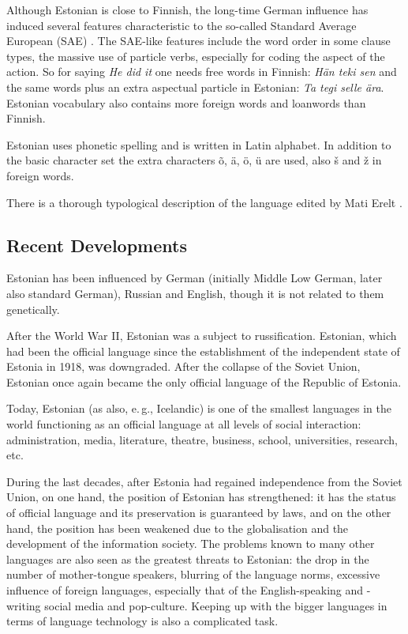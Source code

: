 \begin{multicols}{2}
Although Estonian is close to Finnish, the long-time German influence has induced several features characteristic to the so-called Standard Average European (SAE) \cite{Metslang09}. 
The SAE-like features include the word order in some clause types, the massive use of particle verbs, especially for coding the aspect of the action. 
So for saying \textit{He did it} one needs free words in Finnish: \textit{Hän teki sen} and the same words plus an extra aspectual particle in Estonian: \textit{Ta tegi selle ära}. 
Estonian vocabulary also contains more foreign words and loanwords than Finnish.

Estonian uses phonetic spelling and is written in Latin alphabet. 
In addition to the basic character set the extra characters õ, ä, ö, ü are used, also š and ž in foreign words.

There is a thorough typological description of the language edited by Mati Erelt \cite{erelt2003}. %

\subsection{Recent Developments}

Estonian has been influenced by German (initially Middle Low German, later also standard German), Russian and English, though it is not related to them genetically.

After the World War II, Estonian was a subject to russiﬁcation. 
Estonian, which had been the official language since the establishment of the independent state of Estonia in 1918, was downgraded. 
After the collapse of the Soviet Union, Estonian once again became the
only official language of the Republic of Estonia. 
 
Today, Estonian (as also, e.\,g., Icelandic) is one of the smallest languages in the world functioning as an official language at all levels of social interaction: administration, media, literature, theatre, business, school, universities, research, etc.

During the last decades, after Estonia had regained independence from the Soviet Union, on one hand, the position of Estonian has strengthened: it has the status of official language and its preservation is guaranteed by laws, and on the other hand, the position has been weakened due to the globalisation and the development of the information society. 
The problems known to many other languages are also seen as the greatest threats to Estonian: the drop in the number of mother-tongue speakers, blurring of the language norms, excessive inﬂuence of foreign languages, especially that of the English-speaking and -writing social media and pop-culture. 
Keeping up with the bigger languages in terms of language technology is also a complicated task.


\end{multicols}
